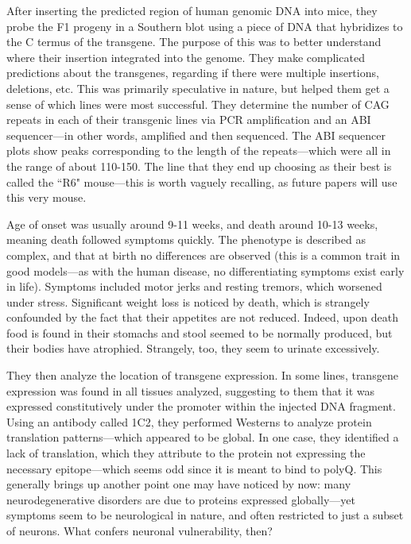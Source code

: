 After inserting the predicted region of human genomic DNA into mice, they probe the F1 progeny in a Southern blot using a piece of DNA that hybridizes to the C termus of the transgene. The purpose of this was to better understand where their insertion integrated into the genome. They make complicated predictions about the transgenes, regarding if there were multiple insertions, deletions, etc. This was primarily speculative in nature, but helped them get a sense of which lines were most successful. They determine the number of CAG repeats in each of their transgenic lines via PCR amplification and an ABI sequencer---in other words, amplified and then sequenced. The ABI sequencer plots show peaks corresponding to the length of the repeats---which were all in the range of about 110-150. The line that they end up choosing as their best is called the ``R6" mouse---this is worth vaguely recalling, as future papers will use this very mouse.\newline

 Age of onset was usually around 9-11 weeks, and death around 10-13 weeks, meaning death followed symptoms quickly. The phenotype is described as complex, and that at birth no differences are observed (this is a common trait in good models---as with the human disease, no differentiating symptoms exist early in life). Symptoms included motor jerks and resting tremors, which worsened under stress. Significant weight loss is noticed by death, which is strangely confounded by the fact that their appetites are not reduced. Indeed, upon death food is found in their stomachs and stool seemed to be normally produced, but their bodies have atrophied. Strangely, too, they seem to urinate excessively.\newline
 
 They then analyze the location of transgene expression. In some lines, transgene expression was found in all tissues analyzed, suggesting to them that it was expressed constitutively under the promoter within the injected DNA fragment. Using an antibody called 1C2, they performed Westerns to analyze protein translation patterns---which appeared to be global. In one case, they identified a lack of translation, which they attribute to the protein not expressing the necessary epitope---which seems odd since it is meant to bind to polyQ. This generally brings up another point one may have noticed by now: many neurodegenerative disorders are due to proteins expressed globally---yet symptoms seem to be neurological in nature, and often restricted to just a subset of neurons. What confers neuronal vulnerability, then?\newline

